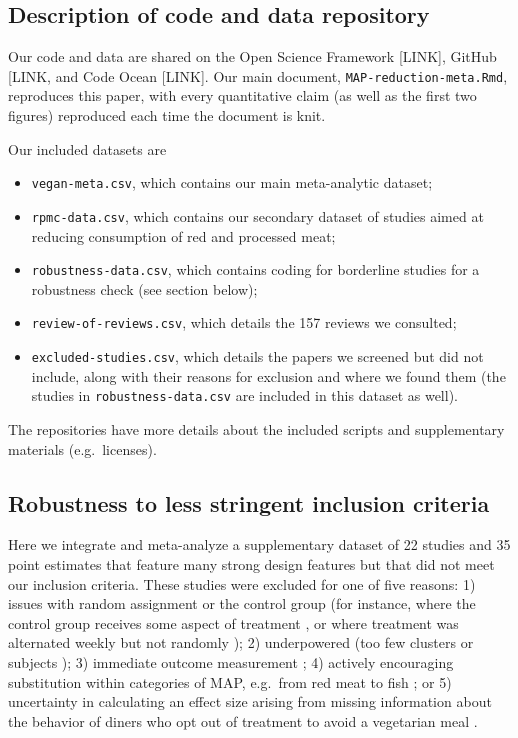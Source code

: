 \documentclass[sn-nature,referee,pdflatex]{sn-jnl}
\begin{document}
\subsection{Description of code and data
repository}\label{description-of-code-and-data-repository}

Our code and data are shared on the Open Science Framework {[}LINK{]},
GitHub {[}LINK, and Code Ocean {[}LINK{]}. Our main document,
\texttt{MAP-reduction-meta.Rmd}, reproduces this paper, with every
quantitative claim (as well as the first two figures) reproduced each
time the document is knit.

Our included datasets are

\begin{itemize}
\item
  \texttt{vegan-meta.csv}, which contains our main meta-analytic
  dataset;
\item
  \texttt{rpmc-data.csv}, which contains our secondary dataset of
  studies aimed at reducing consumption of red and processed meat;
\item
  \texttt{robustness-data.csv}, which contains coding for borderline
  studies for a robustness check (see section below);
\item
  \texttt{review-of-reviews.csv}, which details the 157 reviews we
  consulted;
\item
  \texttt{excluded-studies.csv}, which details the papers we screened
  but did not include, along with their reasons for exclusion and where
  we found them (the studies in \texttt{robustness-data.csv} are
  included in this dataset as well).
\end{itemize}

The repositories have more details about the included scripts and
supplementary materials (e.g.~licenses).

\subsection{Robustness to less stringent inclusion
criteria}\label{Sec5.1.1}

Here we integrate and meta-analyze a supplementary dataset of 22 studies
and 35 point estimates that feature many strong design features but that
did not meet our inclusion criteria. These studies were excluded for one
of five reasons: 1) issues with random assignment or the control group
(for instance, where the control group receives some aspect of treatment
\citep{piazza2022}, or where treatment was alternated weekly but not
randomly \citep{garnett2020}); 2) underpowered (too few clusters
\citep{reinders2017} or subjects \citep{lentz2019}); 3) immediate
outcome measurement
\citep{dannenberg2023, sparkman2017, griesoph2021, hansen2021}; 4)
actively encouraging substitution within categories of MAP, e.g.~from
red meat to fish \citep{celis2017, johansen2009}; or 5) uncertainty in
calculating an effect size arising from missing information about the
behavior of diners who opt out of treatment to avoid a vegetarian meal
\citep{betterfoodfoundation2023}.
\end{document}
